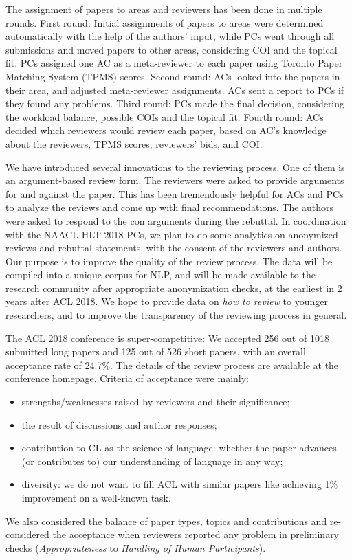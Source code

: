 The assignment of papers to areas and reviewers has been done in multiple rounds. First round: Initial assignments of papers to areas were determined automatically with the help of the authors’ input, while PCs went through all submissions and moved papers to other areas, considering COI and the topical fit. PCs assigned one AC as a meta-reviewer to each paper using Toronto Paper Matching System (TPMS) scores. Second round: ACs looked into the papers in their area, and adjusted meta-reviewer assignments. ACs sent a report to PCs if they found any problems. Third round: PCs made the final decision, considering the workload balance, possible COIs and the topical fit. Fourth round: ACs decided which reviewers would review each paper, based on AC’s knowledge about the reviewers, TPMS scores, reviewers’ bids, and COI.

We have introduced several innovations to the reviewing process. One of them is an argument-based review form. The reviewers were asked to provide arguments for and against the paper. This has been tremendously helpful for ACs and PCs to analyze the reviews and come up with final recommendations. The authors were asked to respond to the con arguments during the rebuttal. In coordination with the NAACL HLT 2018 PCs, we plan to do some analytics on anonymized reviews and rebuttal statements, with the consent of the reviewers and authors. Our purpose is to improve the quality of the review process. The data will be compiled into a unique corpus for NLP, and will be made available to the research community after appropriate anonymization checks, at the earliest in 2 years after ACL 2018. We hope to provide data on \emph{how to review} to younger researchers, and to improve the transparency of the reviewing process in general. 

The ACL 2018 conference is super-competitive: We accepted 256 out of 1018 submitted long papers and 125 out of 526 short papers, with an overall acceptance rate of 24.7\%. The details of the review process are available at the conference homepage. 
Criteria of acceptance were mainly: 
\begin{itemize}
	\item strengths/weaknesses raised by reviewers and their significance;
	\item the result of discussions and author responses;
	\item contribution to CL as the science of language: whether the paper advances (or contributes to) our understanding of language in any way;
	\item diversity: we do not want to fill ACL with similar papers like achieving 1\% improvement on a well-known task.  
\end{itemize}
We also considered the balance of paper types, topics and contributions and
re-considered the acceptance when reviewers reported any problem in preliminary checks (\textit{Appropriateness} to \textit{Handling of Human Participants}).

